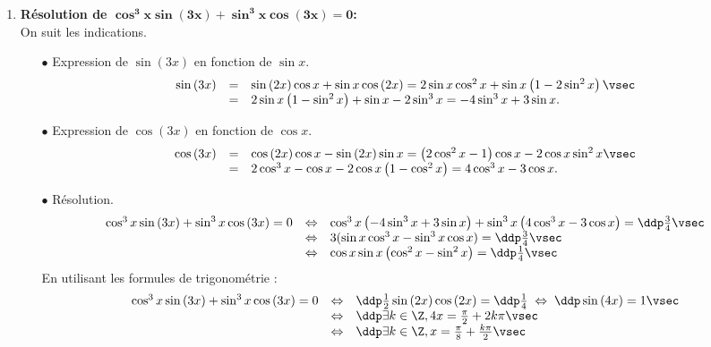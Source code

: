 \begin{correction}
\begin{enumerate}
\item \textbf{R\'esolution de $\mathbf{ \cos^3{x}\sin{(3x)}+\sin^3{x}\cos{(3x)}=0 }$:}\\
\noindent
On suit les indications.
\begin{itemize}
 \item[$\bullet$] Expression de $\sin{(3x)}$ en fonction de $\sin{x}$.
$$\begin{array}{lll}
\sin{(3x)}&=& \sin{(2x)}\cos{x}+\sin{x}\cos{(2x)}
= 2\sin{x}\cos^2{x}+\sin{x}\left( 1-2\sin^2{x}  \right)\vsec\\
&=& 2\sin{x}\left(1-\sin^2{x}\right)+\sin{x}-2\sin^3{x}
= -4\sin^3{x}+3\sin{x}.
\end{array}$$
\item[$\bullet$] Expression de $\cos{(3x)}$ en fonction de $\cos{x}$.
$$\begin{array}{lll}
\cos{(3x)}&=& \cos{(2x)}\cos{x}-\sin{(2x)}\sin{x}
= \left(2\cos^2{x}-1   \right)\cos{x}-2\cos{x}\sin^2{x}\vsec\\
&=& 2\cos^3{x}-\cos{x}-2\cos{x}\left( 1-\cos^2{x}  \right)
= 4\cos^3{x}-3\cos{x}.
\end{array}$$
\item[$\bullet$]  R\'esolution.
$$\begin{array}{lll}
\cos^3{x}\sin{(3x)}+\sin^3{x}\cos{(3x)}=0&\Leftrightarrow & \cos^3{x}\left(  -4\sin^3{x}+3\sin{x} \right)+\sin^3{x}\left( 4\cos^3{x}-3\cos{x} \right)=\ddp \frac{3}{4}\vsec\\
&\Leftrightarrow& 3(\sin{x}\cos^3{x}-\sin^3{x}\cos{x})=\ddp \frac{3}{4}\vsec\\
&\Leftrightarrow& \cos{x}\sin{x}\left( \cos^2{x}-\sin^2{x}  \right)=\ddp \frac{1}{4}\vsec\\
\end{array}$$
En utilisant les formules de trigonom\'etrie :
$$\begin{array}{lll}
\cos^3{x}\sin{(3x)}+\sin^3{x}\cos{(3x)}=0&\Leftrightarrow& \ddp \frac{1}{2} \sin{(2x)}\cos{(2x)}=\ddp \frac{1}{4} \; \Leftrightarrow \; \ddp \sin{(4x)}=1\vsec\\
&\Leftrightarrow& \ddp \exists k \in \Z, 4x= \frac{\pi}{2} + 2k \pi\vsec\\
&\Leftrightarrow& \ddp \exists k \in \Z, x= \frac{\pi}{8} + \frac{k \pi}{2}\vsec\\
\end{array}$$
\end{itemize}

\end{enumerate}
\end{correction}
